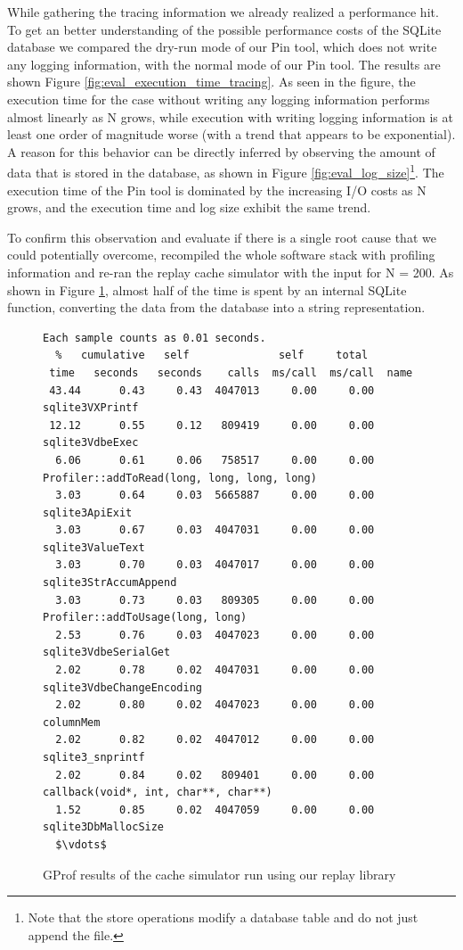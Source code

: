 While gathering the tracing information we already realized a
performance hit. To get an better understanding of the possible
performance costs of the SQLite database we compared the dry-run mode
of our Pin tool, which does not write any logging information, with
the normal mode of our Pin tool. The results are shown Figure
\ref{fig:eval_execution_time_tracing}. As seen in the figure, the
execution time for the case without writing any logging information
performs almost linearly as N grows, while execution with writing logging
information is at least one order of magnitude worse (with a trend
that appears to be exponential). A reason for this behavior can be directly 
inferred by observing the amount of data that is stored in the
database, as shown in Figure \ref{fig:eval_log_size}\footnote{Note
  that the store operations modify a database table and do not just
  append the file.}. The execution time of the Pin tool is dominated
by the increasing I/O costs as N grows, and the execution time
and log size exhibit the same trend.
   
To confirm this observation and evaluate if there
is a single root cause that we could potentially overcome, recompiled
the whole software stack with profiling information and re-ran the
replay cache simulator with the input for N = 200. As shown in
Figure \ref{fig:profiler}, almost half of the time is spent by
an internal SQLite function, converting the data from the database
into a string representation.


\begin{figure}
  \lstset{basicstyle=\footnotesize, mathescape=true}
  \begin{lstlisting}
Each sample counts as 0.01 seconds.
  %   cumulative   self              self     total           
 time   seconds   seconds    calls  ms/call  ms/call  name    
 43.44      0.43     0.43  4047013     0.00     0.00  sqlite3VXPrintf
 12.12      0.55     0.12   809419     0.00     0.00  sqlite3VdbeExec
  6.06      0.61     0.06   758517     0.00     0.00  Profiler::addToRead(long, long, long, long)
  3.03      0.64     0.03  5665887     0.00     0.00  sqlite3ApiExit
  3.03      0.67     0.03  4047031     0.00     0.00  sqlite3ValueText
  3.03      0.70     0.03  4047017     0.00     0.00  sqlite3StrAccumAppend
  3.03      0.73     0.03   809305     0.00     0.00  Profiler::addToUsage(long, long)
  2.53      0.76     0.03  4047023     0.00     0.00  sqlite3VdbeSerialGet
  2.02      0.78     0.02  4047031     0.00     0.00  sqlite3VdbeChangeEncoding
  2.02      0.80     0.02  4047023     0.00     0.00  columnMem
  2.02      0.82     0.02  4047012     0.00     0.00  sqlite3_snprintf
  2.02      0.84     0.02   809401     0.00     0.00  callback(void*, int, char**, char**)
  1.52      0.85     0.02  4047059     0.00     0.00  sqlite3DbMallocSize
  $\vdots$
  \end{lstlisting}
  \caption{GProf results of the cache simulator run using our replay library}
  \label{fig:profiler}
\end{figure}


